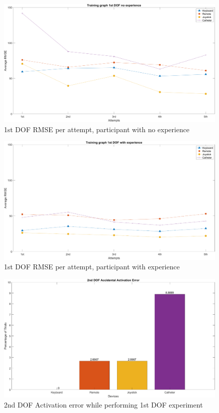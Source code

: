 \begin{figure}[ht]
   \centering
   \includegraphics[width=1.0\textwidth]{img/1st/1stTrainNoExp.png}
   \caption{1st DOF RMSE per attempt, participant with no experience}
   \label{img:1stTrainNoExp}
\end{figure}

\begin{figure}[ht]
   \centering
   \includegraphics[width=1.0\textwidth]{img/1st/1stTrainExp.png}
   \caption{1st DOF RMSE per attempt, participant with experience}
   \label{img:1stTrainExp}
\end{figure}

\begin{figure}[ht]
   \centering
   \includegraphics[width=1.0\textwidth]{img/1st/1stAct.png}
   \caption{2nd DOF Activation error while performing 1st DOF experiment}
   \label{img:1stAct}
\end{figure}

